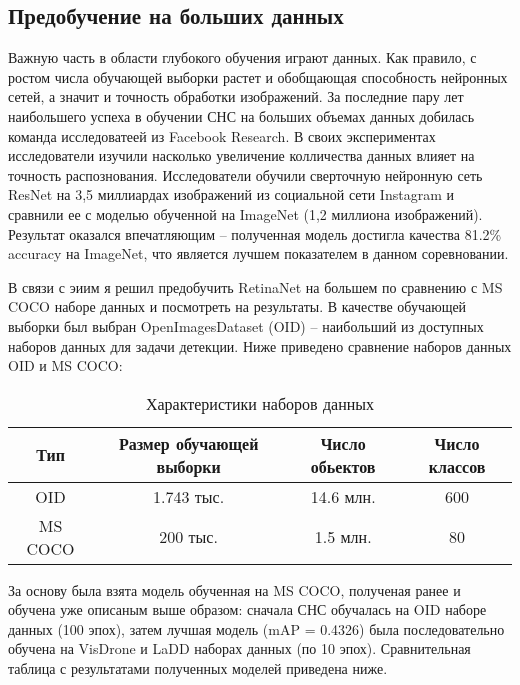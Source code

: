\subsection{Предобучение на больших данных} \label{sect-6-2}

Важную часть в области глубокого обучения играют данных. Как правило, с ростом числа обучающей выборки растет и обобщающая способность нейронных сетей, а значит и точность обработки изображений. За последние пару лет наибольшего успеха в обучении СНС на больших объемах данных добилась команда исследоватеей из Facebook Research. В своих экспериментах исследователи изучили насколько увеличение колличества данных влияет на точность распознования. Исследователи обучили сверточную нейронную сеть ResNet на 3,5 миллиардах изображений из социальной сети Instagram и сравнили ее с моделью обученной на ImageNet (1,2 миллиона изображений). Результат оказался впечатляющим -- полученная модель достигла качества 81.2\% accuracy на ImageNet, что является лучшем показателем в данном соревновании. 


В связи с эиим я решил предобучить RetinaNet на большем по сравнению с MS COCO наборе данных и посмотреть на результаты. В качестве обучающей выборки был выбран OpenImagesDataset (OID) -- наибольший из доступных наборов данных для задачи детекции. Ниже приведено сравнение наборов данных OID и MS COCO:

\begin{table}[H]
    \caption{Характеристики наборов данных}\label{datasets}
    \begin{tabular}{|c|c|c|c|}
        \hline
        {Тип} & {Размер обучающей выборки} & {Число обьектов} & {Число классов} \\
        \hline
        OID & 1.743 тыс. & 14.6 млн. & 600 \\
        \hline
        MS COCO & 200 тыс. & 1.5 млн. & 80 \\
        \hline
    \end{tabular}
\end{table}

За основу была взята модель обученная на MS COCO, полученая ранее и обучена уже описаным выше образом: сначала СНС обучалась на OID наборе данных (100 эпох), затем лучшая модель (mAP = 0.4326) была последовательно обучена на VisDrone и LaDD наборах данных (по 10 эпох). Сравнительная таблица с результатами полученных моделей приведена ниже.

